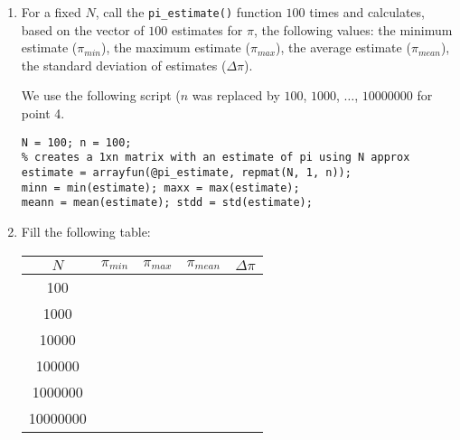\documentclass[fontsize=12pt, usenames, dvipsnames, headinclude, headsepline, footinclude, footsepline]{scrartcl}
\begin{document}
\begin{exo}
\begin{enumerate}
    
  \item For a fixed $N$, call the \texttt{pi\_estimate()} function $100$ times and calculates, based on the vector of $100$
    estimates for $\pi$, the following values: the minimum estimate ($\pi_{min}$), the maximum estimate ($\pi_{max}$), the
    average estimate ($\pi_{mean}$), the standard deviation of estimates ($\Delta \pi$).

    \begin{sol}
      We use the following script ($n$ was replaced by $100$, $1000$, $\ldots$, $10000000$ for point 4.
\begin{lstlisting}
N = 100; n = 100;
% creates a 1xn matrix with an estimate of pi using N approx
estimate = arrayfun(@pi_estimate, repmat(N, 1, n));
minn = min(estimate); maxx = max(estimate); 
meann = mean(estimate); stdd = std(estimate);
\end{lstlisting}
    \end{sol}

    
  \item Fill the following table:\hfill\\
    \begin{center}
      \begin{tabular}{|c|c|c|c|c|}
        \hline
        $N$      &  $\pi_{min}$  &  $\pi_{max}$  &  $\pi_{mean}$ &  $\Delta \pi$  \\\hline
        100      &              &              &              &  \\\hline
        1000     &              &              &              &  \\\hline
        10000    &              &              &              &  \\\hline
        100000   &              &              &              &  \\\hline
        1000000  &              &              &              &  \\\hline
        10000000 &              &              &              &  \\\hline
      \end{tabular}
    \end{center}



\end{enumerate}
\end{exo}
\end{document}
